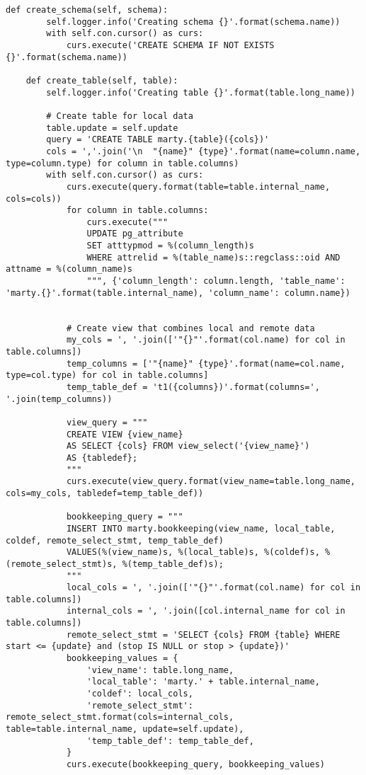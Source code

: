 \begin{lstlisting}[caption={populator.py}]
    def create_schema(self, schema):
        self.logger.info('Creating schema {}'.format(schema.name))
        with self.con.cursor() as curs:
            curs.execute('CREATE SCHEMA IF NOT EXISTS {}'.format(schema.name))

    def create_table(self, table):
        self.logger.info('Creating table {}'.format(table.long_name))

        # Create table for local data
        table.update = self.update
        query = 'CREATE TABLE marty.{table}({cols})'
        cols = ','.join('\n  "{name}" {type}'.format(name=column.name, type=column.type) for column in table.columns)
        with self.con.cursor() as curs:
            curs.execute(query.format(table=table.internal_name, cols=cols))
            for column in table.columns:
                curs.execute("""
                UPDATE pg_attribute
                SET atttypmod = %(column_length)s
                WHERE attrelid = %(table_name)s::regclass::oid AND attname = %(column_name)s
                """, {'column_length': column.length, 'table_name': 'marty.{}'.format(table.internal_name), 'column_name': column.name})


            # Create view that combines local and remote data
            my_cols = ', '.join(['"{}"'.format(col.name) for col in table.columns])
            temp_columns = ['"{name}" {type}'.format(name=col.name, type=col.type) for col in table.columns]
            temp_table_def = 't1({columns})'.format(columns=', '.join(temp_columns))

            view_query = """
            CREATE VIEW {view_name}
            AS SELECT {cols} FROM view_select('{view_name}')
            AS {tabledef};
            """
            curs.execute(view_query.format(view_name=table.long_name, cols=my_cols, tabledef=temp_table_def))

            bookkeeping_query = """
            INSERT INTO marty.bookkeeping(view_name, local_table, coldef, remote_select_stmt, temp_table_def)
            VALUES(%(view_name)s, %(local_table)s, %(coldef)s, %(remote_select_stmt)s, %(temp_table_def)s);
            """
            local_cols = ', '.join(['"{}"'.format(col.name) for col in table.columns])
            internal_cols = ', '.join([col.internal_name for col in table.columns])
            remote_select_stmt = 'SELECT {cols} FROM {table} WHERE start <= {update} and (stop IS NULL or stop > {update})'
            bookkeeping_values = {
                'view_name': table.long_name,
                'local_table': 'marty.' + table.internal_name,
                'coldef': local_cols,
                'remote_select_stmt': remote_select_stmt.format(cols=internal_cols, table=table.internal_name, update=self.update),
                'temp_table_def': temp_table_def,
            }
            curs.execute(bookkeeping_query, bookkeeping_values)


\end{lstlisting}
